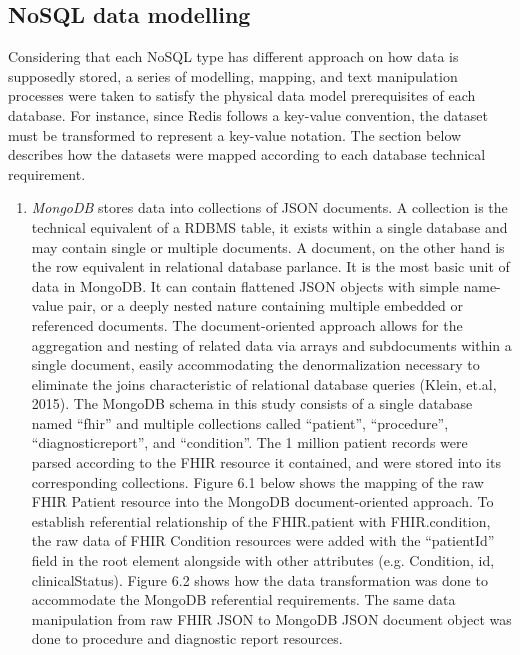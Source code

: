 \documentclass[5p]{elsarticle}
\begin{document}
\subsection{NoSQL data modelling}
Considering that each NoSQL type has different approach on how data is supposedly stored,
a series of modelling, mapping, and text manipulation processes were taken to satisfy the physical data model prerequisites of each database. 
For instance, since Redis follows a key-value convention, the dataset must be transformed to represent a key-value notation. 
The section below describes how the datasets were mapped according to each database technical requirement. 

\begin{enumerate}
\item \emph{MongoDB} stores data into collections of JSON documents. A collection is the technical equivalent of a RDBMS table, it exists within a single database and may contain single or multiple documents. A document, on the other hand is the row equivalent in relational database parlance. It is the most basic unit of data in MongoDB. It can contain flattened JSON objects with simple name-value pair, or a deeply nested nature containing multiple embedded or referenced documents. The document-oriented approach allows for the aggregation and nesting of related data via arrays and subdocuments within a single document, easily accommodating the denormalization necessary to eliminate the joins characteristic of relational database queries (Klein, et.al, 2015). The MongoDB schema in this study consists of a single database named “fhir” and multiple collections called “patient”, “procedure”, “diagnosticreport”, and “condition”. The 1 million patient records were parsed according to the FHIR resource it contained, and were stored into its corresponding collections. Figure 6.1 below shows the mapping of the raw FHIR Patient resource into the MongoDB document-oriented approach. 
To establish referential relationship of the FHIR.patient with FHIR.condition, the raw data of FHIR Condition resources were added with the “patientId” field in the root element alongside with other attributes (e.g. Condition, id, clinicalStatus). Figure 6.2 shows how the data transformation was done to accommodate the MongoDB referential requirements. The same data manipulation from raw FHIR JSON to MongoDB JSON document object was done to procedure and diagnostic report resources.
\\

\end{enumerate}
\end{document}
